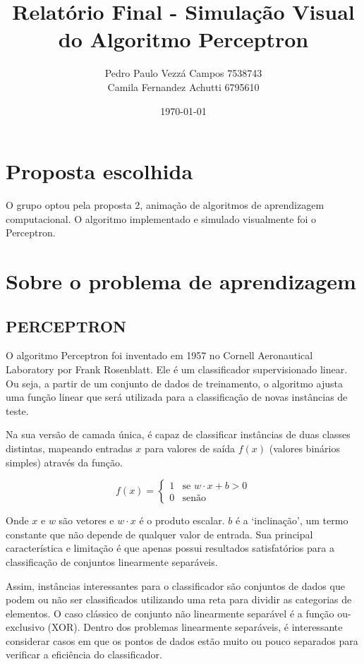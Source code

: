\documentclass[brazil, a4paper]{article}
\begin{document}
\title{Relatório Final - Simulação Visual do Algoritmo Perceptron}
\author{Pedro Paulo Vezzá Campos \hfill 7538743\\
		Camila Fernandez Achutti \hfill 6795610}
\date{\today}

\maketitle


\section{Proposta escolhida}

O grupo optou pela proposta 2, animação de algoritmos de aprendizagem
computacional. O algoritmo implementado e simulado visualmente foi o Perceptron.

\section{Sobre o problema de aprendizagem}

\subsection{PERCEPTRON}

O algoritmo Perceptron foi inventado em 1957 no Cornell Aeronautical Laboratory
por Frank Rosenblatt. Ele é um classificador supervisionado linear. Ou seja,  a
partir de um conjunto de dados de treinamento, o algoritmo ajusta uma função
linear que será utilizada para a classificação de novas instâncias de teste.

Na sua versão de camada única, é capaz de classificar instâncias de duas classes
distintas, mapeando entradas $x$ para valores de saída $f(x)$ (valores
binários simples) através da função.

$$ f(x) = \begin{cases}1 & \text{se }w \cdot x + b > 0\\0 & \text{senão}\end{cases} $$

Onde $x$ e $w$ são vetores e $w \cdot x$ é o produto escalar. $b$ é a
`inclinação', um termo constante que não depende de qualquer valor de
entrada. Sua principal característica e limitação é que apenas possui  resultados
satisfatórios para a classificação de conjuntos linearmente separáveis.

Assim, instâncias interessantes para o classificador são conjuntos de dados que
podem ou não ser classificados utilizando uma reta para dividir as categorias
de elementos. O caso clássico de conjunto não linearmente separável é a
função ou-exclusivo (XOR). Dentro dos problemas linearmente separáveis,
é interessante considerar casos em que os pontos de dados estão muito ou
pouco separados para verificar a eficiência do classificador.
\end{document}
